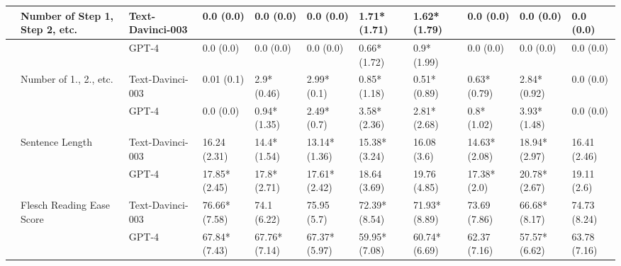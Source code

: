 \begin{tabular}{x{0.75cm}|x{1.5cm}|x{0.75cm}|x{0.75cm}|x{0.75cm}|x{0.75cm}|x{0.75cm}|x{0.75cm}|x{0.75cm}|x{0.75cm}|x{0.75cm}}
\hline
 & Number of Step 1, Step 2, etc. & Text-Davinci-003 & 0.0 (0.0) & 0.0 (0.0) & 0.0 (0.0) & 1.71* (1.71) & 1.62* (1.79) & 0.0 (0.0) & 0.0 (0.0) & 0.0 (0.0) \\
\hline
 &  & GPT-4 & 0.0 (0.0) & 0.0 (0.0) & 0.0 (0.0) & 0.66* (1.72) & 0.9* (1.99) & 0.0 (0.0) & 0.0 (0.0) & 0.0 (0.0) \\
\hline
 & Number of 1., 2., etc. & Text-Davinci-003 & 0.01 (0.1) & 2.9* (0.46) & 2.99* (0.1) & 0.85* (1.18) & 0.51* (0.89) & 0.63* (0.79) & 2.84* (0.92) & 0.0 (0.0) \\
\hline
 &  & GPT-4 & 0.0 (0.0) & 0.94* (1.35) & 2.49* (0.7) & 3.58* (2.36) & 2.81* (2.68) & 0.8* (1.02) & 3.93* (1.48) & 0.0 (0.0) \\
\hline
 & Sentence Length & Text-Davinci-003 & 16.24 (2.31) & 14.4* (1.54) & 13.14* (1.36) & 15.38* (3.24) & 16.08 (3.6) & 14.63* (2.08) & 18.94* (2.97) & 16.41 (2.46) \\
\hline
 &  & GPT-4 & 17.85* (2.45) & 17.8* (2.71) & 17.61* (2.42) & 18.64 (3.69) & 19.76 (4.85) & 17.38* (2.0) & 20.78* (2.67) & 19.11 (2.6) \\
\hline
 & Flesch Reading Ease Score & Text-Davinci-003 & 76.66* (7.58) & 74.1 (6.22) & 75.95 (5.7) & 72.39* (8.54) & 71.93* (8.89) & 73.69 (7.86) & 66.68* (8.17) & 74.73 (8.24) \\
\hline
 &  & GPT-4 & 67.84* (7.43) & 67.76* (7.14) & 67.37* (5.97) & 59.95* (7.08) & 60.74* (6.69) & 62.37 (7.16) & 57.57* (6.62) & 63.78 (7.16) \\
\hline
\bottomrule
\end{tabular}
